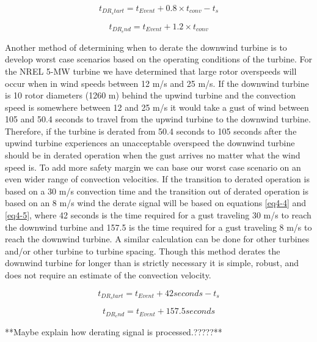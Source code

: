 \begin{equation}
	t_{DR_start} = t_{Event} + 0.8 \times t_{conv} - t_s \label{eq4-2}
\end{equation}

\begin{equation}
	t_{DR_end} = t_{Event} + 1.2 \times t_{conv} \label{eq4-3}
\end{equation}



Another method of determining when to derate the downwind turbine is to develop worst case scenarios based on the operating conditions of the turbine. For the NREL 5-MW turbine we have determined that large rotor overspeeds will occur when in wind speeds between 12 m/s and 25 m/s. If the downwind turbine is 10 rotor diameters (1260 m) behind the upwind turbine and the convection speed is somewhere between 12 and 25 m/s it would take a gust of wind between 105 and 50.4 seconds to travel from the upwind turbine to the downwind turbine. Therefore, if the turbine is derated from 50.4 seconds to 105 seconds after the upwind turbine experiences an unacceptable overspeed the downwind turbine should be in derated operation when the gust arrives no matter what the wind speed is. To add more safety margin we can base our worst case scenario on an even wider range of convection velocities. If the transition to derated operation is based on a 30 m/s convection time and the transition out of derated operation is based on an 8 m/s wind the derate signal will be based on equations \ref{eq4-4} and \ref{eq4-5}, where 42 seconds is the time required for a gust traveling 30 m/s to reach the downwind turbine and 157.5 is the time required for a gust traveling 8 m/s to reach the downwind turbine.  A similar calculation can be done for other turbines and/or other turbine to turbine spacing. Though this method derates the downwind turbine for longer than is strictly necessary it is simple, robust, and does not require an estimate of the convection velocity.

\begin{equation}
	t_{DR_start} = t_{Event} + 42 seconds - t_s \label{eq4-4}
\end{equation}

\begin{equation}
	t_{DR_end} = t_{Event} + 157.5 seconds \label{eq4-5}
\end{equation}






**Maybe explain how derating signal is processed.?????**


